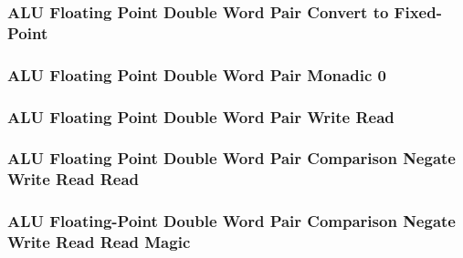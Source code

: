 \subsubsection[{\small ALU Floating Point Double Word Pair Convert to Fixed-Point}]{ALU Floating Point Double Word Pair Convert to Fixed-Point} \label{sec:format-ALU-FDPFIXED}



\subsubsection[{\small ALU Floating Point Double Word Pair Monadic 0}]{ALU Floating Point Double Word Pair Monadic 0} \label{sec:format-ALU-FDPMO0}



\subsubsection[{\small ALU Floating Point Double Word Pair Write Read}]{ALU Floating Point Double Word Pair Write Read} \label{sec:format-ALU-FDPWR}



\subsubsection[{\small ALU Floating Point Double Word Pair Comparison Negate Write Read Read}]{ALU Floating Point Double Word Pair Comparison Negate Write Read Read} \label{sec:format-ALU-FDPCNWRR}



\subsubsection[{\small ALU Floating-Point Double Word Pair Comparison Negate Write Read Read Magic}]{ALU Floating-Point Double Word Pair Comparison Negate Write Read Read Magic} \label{sec:format-ALU-FDPCNWRR.M}



